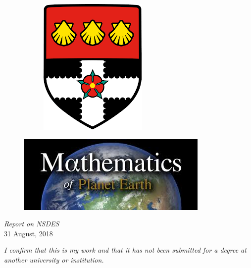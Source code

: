 \documentclass[12pt,a4paper]{article}
\numberwithin{equation}{section}
\theoremstyle{definition}
\begin{document}
\begin{titlepage}
\begin{figure}[H]
\begin{subfigure}[b]{.1263\linewidth}
				\includegraphics[width=\linewidth]{uor_logo_big}
				\label{uor_logo_big}
			\end{subfigure}
			\centering
		\end{figure}
	\vspace{-14mm}
		\begin{figure}[H]
			\includegraphics[width=.3\linewidth]{mpe_cdt_logo}
			\centering
		\end{figure}
		\vfill %
		\textit{Report on NSDES\\} %
		31 August, 2018 %
		
		
	\end{titlepage}
\pagebreak
\thispagestyle{empty}
\emph{I confirm that this is my work and that it has not been submitted for a degree at another university or institution.\\}
\emph{\\}
\emph{\\}
	\vspace{1\baselineskip} 
\pagebreak
\pagebreak
\thispagestyle{empty}
\tableofcontents
\end{document}
